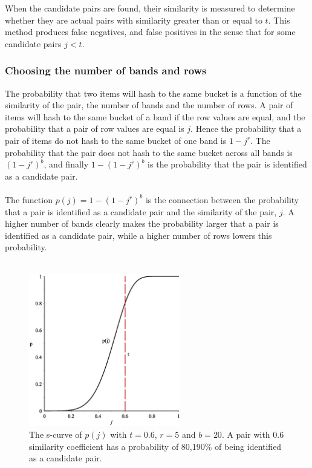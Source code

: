 When the candidate pairs are found, their similarity is measured to determine whether they are actual pairs with similarity greater than or equal to \(t\). This method produces false negatives, and false positives in the sense that for some candidate pairs \(j<t\).

\subsubsection{Choosing the number of bands and rows}
The probability that two items will hash to the same bucket is a function of the similarity of the pair, the number of bands and the number of rows. A pair of items will hash to the same bucket of a band if the row values are equal, and the probability that a pair of row values are equal is \(j\). Hence the probability that a pair of items do not hash to the same bucket of one band is \(1-j^r\). The probability that the pair does not hash to the same bucket across all bands is \((1-j^r)^b\), and finally \(1-(1-j^r)^b\) is the probability that the pair is identified as a candidate pair.\cite{lsh}\\ \\
The function \(p(j) = 1-(1-j^r)^b\) is the connection between the probability that a pair is identified as a candidate pair and the similarity of the pair, \(j\). A higher number of bands clearly makes the probability larger that a pair is identified as a candidate pair, while a higher number of rows lowers this probability.\\ \\
\begin{figure}[H]
	\includegraphics[width=250px]{img/pGraph.eps}
	\caption{The s-curve of \(p(j)\) with \(t = 0.6\), \(r = 5\) and \(b =20\). A pair with 0.6 similarity coefficient has a probability of 80,190\% of being identified as a candidate pair.} 
	\label{fig:p_graph}
\end{figure}
